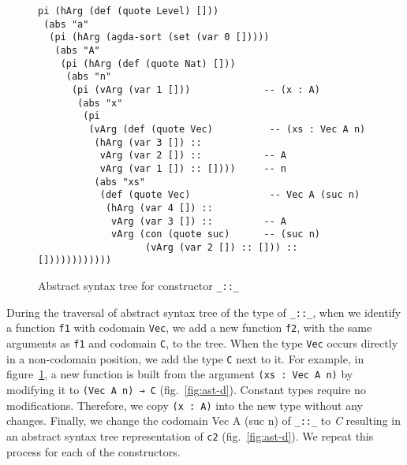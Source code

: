 \documentclass[sigplan,10pt]{acmart}
\begin{document}
\begin{figure}
\begin{center}
\begingroup
\fontsize{7pt}{9pt}\selectfont
\begin{Verbatim}[frame = single]
pi (hArg (def (quote Level) []))
 (abs "a"
  (pi (hArg (agda-sort (set (var 0 []))))
   (abs "A"
    (pi (hArg (def (quote Nat) []))
     (abs "n"
      (pi (vArg (var 1 []))             -- (x : A)
       (abs "x"
        (pi
         (vArg (def (quote Vec)          -- (xs : Vec A n)
          (hArg (var 3 []) ::           
           vArg (var 2 []) ::           -- A
           vArg (var 1 []) :: [])))     -- n
          (abs "xs"
           (def (quote Vec)              -- Vec A (suc n)
            (hArg (var 4 []) ::         
             vArg (var 3 []) ::         -- A
             vArg (con (quote suc)      -- (suc n)
                   (vArg (var 2 []) :: [])) :: [])))))))))))
\end{Verbatim}
\endgroup
\end{center}
\caption{Abstract syntax tree for constructor {\tt \_::\_}}
\label{fig:ast-g}
\end{figure}

\normalsize

During the traversal of abstract syntax tree of the type of {\tt \_::\_}, when we identify a function {\tt f1} with codomain {\tt Vec}, we add a new function {\tt f2}, with the same arguments as {\tt f1} and codomain {\tt C}, to the tree. When the type {\tt Vec} occurs directly in a non-codomain position, we add the type {\tt C} next to it. For example, in figure~\ref{fig:ast-g}, a new function is built from the argument {\tt (xs : Vec A n)} by modifying it to {\tt (Vec A n) → C} (fig.~\ref{fig:ast-d}). Constant types require no modifications. Therefore, we copy {\tt (x : A)} into the new type without any changes. Finally, we change the codomain {Vec A (suc n)} of {\tt \_::\_} to \emph{C} resulting in an abstract syntax tree representation of {\tt c2} (fig.~\ref{fig:ast-d}). We repeat this process for each of the constructors.
\end{document}
